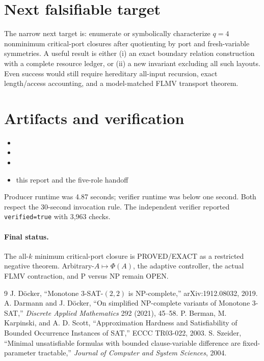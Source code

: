 \documentclass[11pt]{article}
\newcommand{\status}[1]{\textsf{#1}}
\begin{document}
\section{Next falsifiable target}

The narrow next target is: enumerate or symbolically characterize $q=4$ nonminimum critical-port closures after quotienting by port and fresh-variable symmetries.  A useful result is either (i) an exact boundary relation construction with a complete resource ledger, or (ii) a new invariant excluding all such layouts.  Even success would still require hereditary all-input recursion, exact length/access accounting, and a model-matched FLMV transport theorem.

\section{Artifacts and verification}

\begin{itemize}
\item {}
\item {}
\item {}
\item this report and the five-role handoff
\end{itemize}
Producer runtime was 4.87 seconds; verifier runtime was below one second.  Both respect the 30-second invocation rule.  The independent verifier reported \texttt{verified=true} with 3,963 checks.

\paragraph{Final status.}
The all-$k$ minimum critical-port closure is \status{PROVED/EXACT} as a restricted negative theorem.  Arbitrary-$A\mapsto\Phi(A)$, the adaptive controller, the actual FLMV contraction, and P versus NP remain \status{OPEN}.

\begin{thebibliography}{9}
 J. D\"ocker, ``Monotone 3-SAT-$(2,2)$ is NP-complete,'' arXiv:1912.08032, 2019.
 A. Darmann and J. D\"ocker, ``On simplified NP-complete variants of Monotone 3-SAT,'' \emph{Discrete Applied Mathematics} 292 (2021), 45--58.
 P. Berman, M. Karpinski, and A. D. Scott, ``Approximation Hardness and Satisfiability of Bounded Occurrence Instances of SAT,'' ECCC TR03-022, 2003.
 S. Szeider, ``Minimal unsatisfiable formulas with bounded clause-variable difference are fixed-parameter tractable,'' \emph{Journal of Computer and System Sciences}, 2004.
\end{thebibliography}

\end{document}
